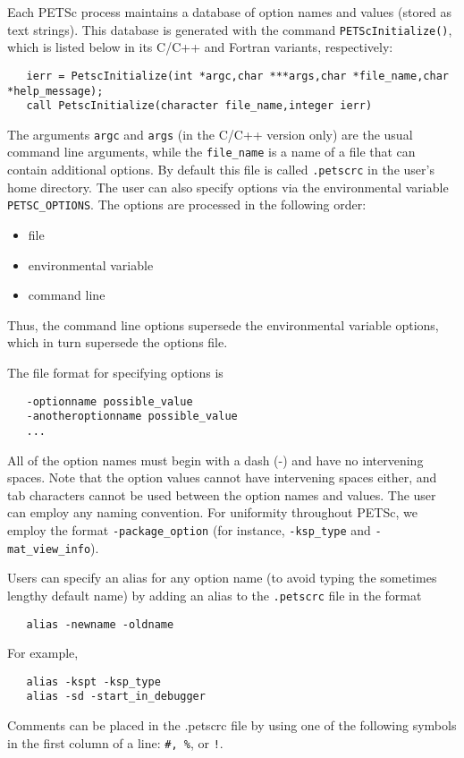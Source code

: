 Each PETSc process maintains a database of option names and values
(stored as text strings). This database is generated with the command
{\tt PETScInitialize()}, which is listed below in its C/C++ and
Fortran variants, respectively:
\begin{verbatim}
   ierr = PetscInitialize(int *argc,char ***args,char *file_name,char *help_message);
   call PetscInitialize(character file_name,integer ierr)
\end{verbatim}
The arguments {\tt argc} and {\tt args} (in the C/C++ version only) are
the usual command line arguments, while the {\tt file\_name} is a name of
a file that can contain additional options. 
By default this file is called {\tt .petscrc}  in the 
user's home directory.  The user can also specify options via the
environmental variable {\tt PETSC\_OPTIONS}.   
The options are processed in the following order:
\begin{itemize}
\item file
\item environmental variable
\item command line
\end{itemize}
Thus, the command line options supersede the environmental variable
options, which in turn supersede the options file.  

The file format for specifying options is 
\begin{verbatim}
   -optionname possible_value
   -anotheroptionname possible_value
   ...
\end{verbatim}
All of the option names must begin with a dash (-) and have no intervening 
spaces.  Note that the option values cannot
have intervening spaces either, and tab characters cannot be used
between the option names and values.
The user can employ any naming convention.  For uniformity throughout
PETSc, we employ the format {\tt -package\_option} (for instance, 
{\tt -ksp\_type} and {\tt -mat\_view\_info}).

Users can specify an alias for any option name (to avoid typing the 
sometimes lengthy default name) by adding an alias to the 
{\tt .petscrc}  file in the format
 
\begin{verbatim}
   alias -newname -oldname
\end{verbatim}
For example,
\begin{verbatim}
   alias -kspt -ksp_type
   alias -sd -start_in_debugger
\end{verbatim}
Comments can be placed in the .petscrc file by using one of the
following symbols in the first column of a line: {\tt \#, \%}, or {\tt !}.

